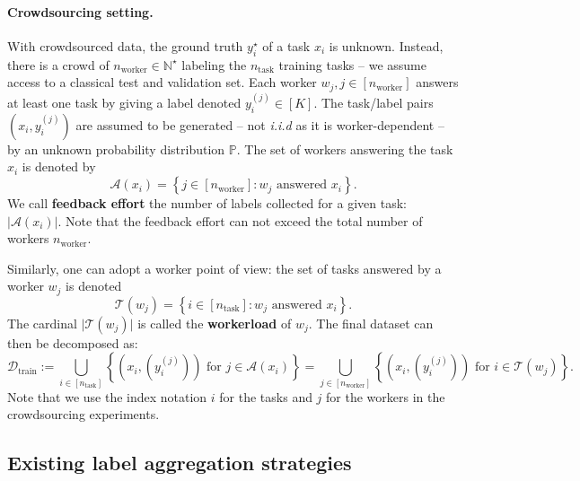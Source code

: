 \paragraph*{Crowdsourcing setting.}
With crowdsourced data, the ground truth $y_i^\star$ of a task $x_i$ is unknown.
Instead, there is a crowd of $n_{\text{worker}}\in \mathbb{N}^\star$ labeling the $n_\text{task}$ training tasks -- we assume access to a classical test and validation set.
Each worker $w_j,j\in [n_{\text{worker}}]$ answers at least one task by giving a label denoted $y_i^{(j)}\in[K]$.
The task/label pairs $(x_i,y_i^{(j)})$ are assumed to be generated -- not \emph{i.i.d} as it is worker-dependent -- by an unknown probability distribution $\mathbb{P}$.
The set of workers answering the task $x_i$ is denoted by
\begin{equation}\label{eq:feedback}
\mathcal{A}(x_i)=\left\{j\in[n_\text{worker}]: w_j \text{ answered }x_i\right\}.
\end{equation}
We call \textbf{feedback effort} the number of labels collected for a given task: $|\mathcal{A}(x_i)|$.
Note that the feedback effort can not exceed the total number of workers $n_{\text{worker}}$.

Similarly, one can adopt a worker point of view: the set of tasks answered by a worker $w_j$ is denoted
\begin{equation}\label{eq:workerload}
\mathcal{T}(w_j)=\left\{i\in[n_\text{task}]: w_j \text{ answered } x_i\right\}.
\end{equation}
The cardinal $\vert \mathcal{T}(w_j)\vert$ is called the \textbf{workerload} of $w_j$.
The final dataset can then be decomposed as:
\begin{equation}\label{eq:trainset}
\mathcal{D}_{\text{train}} := \bigcup_{i\in[n_\text{task}]} \left\{(x_i, (y_i^{(j)})) \text{ for }j\in\mathcal{A}(x_i)\right\} = \bigcup_{j\in[n_\text{worker}]} \left\{(x_i, (y_i^{(j)})) \text{ for }i \in\mathcal{T}(w_j)\right\} .
\end{equation}
Note that we use the index notation $i$ for the tasks and $j$ for the workers in the crowdsourcing experiments.

\subsection{Existing label aggregation strategies}
\label{sub:aggregating_votes}



